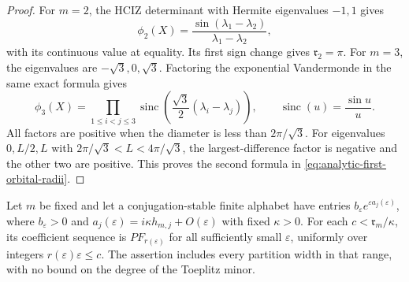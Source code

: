\begin{proof}
For $m=2$, the HCIZ determinant with Hermite eigenvalues $-1,1$
gives
\[
                \phi_2(X)=\frac{\sin(\lambda_1-\lambda_2)}
                                      {\lambda_1-\lambda_2},
\]
with its continuous value at equality. Its first sign change gives
$\mathfrak r_2=\pi$. For $m=3$, the eigenvalues are
$-\sqrt3,0,\sqrt3$. Factoring the exponential Vandermonde in the
same exact formula gives
\[
 \phi_3(X)=\prod_{1\le i<j\le3}
            \operatorname{sinc}\left(
                          \frac{\sqrt3}{2}(\lambda_i-\lambda_j)\right),
                    \qquad\operatorname{sinc}(u)=\frac{\sin u}{u}.
\]
All factors are positive when the diameter is less than
$2\pi/\sqrt3$. For eigenvalues $0,L/2,L$ with
$2\pi/\sqrt3<L<4\pi/\sqrt3$, the largest-difference factor is
negative and the other two are positive. This proves the second
formula in \eqref{eq:analytic-first-orbital-radii}.
\end{proof}

\begin{lemma}
\label{lem:analytic-uniform-cluster-PF}
Let $m$ be fixed and let a conjugation-stable finite alphabet have
entries $b_\varepsilon e^{\varepsilon a_j(\varepsilon)}$, where
$b_\varepsilon>0$ and
$a_j(\varepsilon)=i\kappa h_{m,j}+O(\varepsilon)$ with fixed
$\kappa>0$. For each $c<\mathfrak r_m/\kappa$, its coefficient
sequence is $PF_{r(\varepsilon)}$ for all sufficiently small
$\varepsilon$, uniformly over integers $r(\varepsilon)\varepsilon\le c$.
The assertion includes every partition width in that range, with no
bound on the degree of the Toeplitz minor.
\end{lemma}

